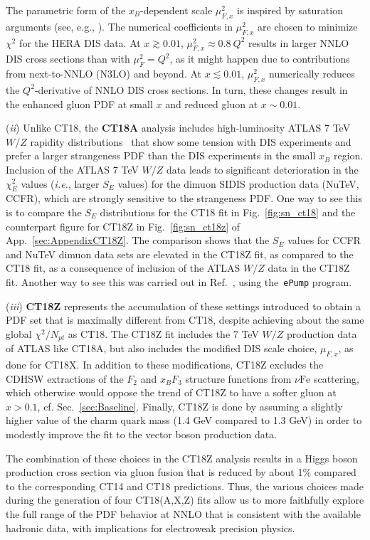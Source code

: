 The parametric form of the $x_B$-dependent scale
$\mu^2_{F,x}$ is inspired by saturation arguments (see, e.g.,
\cite{GolecBiernat:1998js,Caola:2009iy}). The numerical coefficients in $\mu^2_{F,x}$
are chosen to  minimize $\chi^2$ for the HERA DIS data.
%
At $x\gtrsim 0.01$, $\mu_{F,x}^2\approx 0.8\ Q^2$ results in larger NNLO DIS cross sections than with $\mu_{F}^2=Q^2$, as it might happen due to contributions from next-to-NNLO (N3LO) and beyond. At $x \lesssim 0.01$, $\mu_{F,x}^2$ numerically reduces the 
$Q^2$-derivative of NNLO DIS cross sections. In turn, these changes result in the enhanced gluon PDF at small $x$ and
reduced gluon at $x \sim 0.01$.

({\it ii}) Unlike CT18, the {\bf CT18A} analysis includes
high-luminosity ATLAS 7 TeV $W/Z$ rapidity distributions~\cite{Aaboud:2016btc}
that show some tension with DIS experiments and prefer a larger strangeness PDF than the
DIS experiments in the small $x_B$ region. Inclusion of the ATLAS 7 TeV $W/Z$ data leads to
significant deterioration in the $\chi^2_E$ values ({\it i.e.}, larger $S_E$ values)
for the dimuon SIDIS production data (NuTeV, CCFR), which are strongly
sensitive to the strangeness PDF. One way to see this is to compare
the $S_E$ distributions for the CT18 fit in Fig.~\ref{fig:sn_ct18} and the counterpart figure for CT18Z in Fig.~\ref{fig:sn_ct18z} of App.~\ref{sec:AppendixCT18Z}.
The comparison shows that the $S_E$ values for CCFR and NuTeV dimuon data sets are elevated in the CT18Z fit, as compared to the CT18 fit, as a consequence of inclusion of the
ATLAS $W/Z$ data in the CT18Z fit.
Another way to see this was carried out in Ref.~\cite{Hou:2019gfw}, using the~\texttt{ePump} program.   

%
({\it iii}) {\bf CT18Z} represents the accumulation of these settings introduced to obtain a PDF set that is maximally different from CT18,  despite achieving about the same global $\chi^2/N_{pt}$ as CT18. The CT18Z fit
includes the 7 TeV $W/Z$ production data of ATLAS like CT18A, but
also includes the modified DIS scale choice, $\mu_{F,x}$,
as done for CT18X. In addition to these modifications, CT18Z
excludes the CDHSW extractions of the $F_2$ and $x_B F_3$ structure functions
from $\nu\mathrm{Fe}$ scattering, which otherwise would oppose the trend of CT18Z to have a softer gluon at $x>0.1$, cf. Sec.~\ref{sec:Baseline}. Finally, CT18Z is done by assuming a slightly higher value of
the charm quark mass (1.4 GeV compared to 1.3 GeV) in order to modestly improve the fit to the vector boson production data.

The combination of these choices in the
CT18Z analysis results in a Higgs boson production cross section via gluon
fusion that is reduced by about 1\% compared to the corresponding
CT14 and CT18 predictions. Thus, the various choices made during the
generation of four CT18(A,X,Z) fits allow us to more faithfully
explore the full range of the PDF behavior at NNLO that is consistent
with the available hadronic data, with implications for electroweak precision physics.
